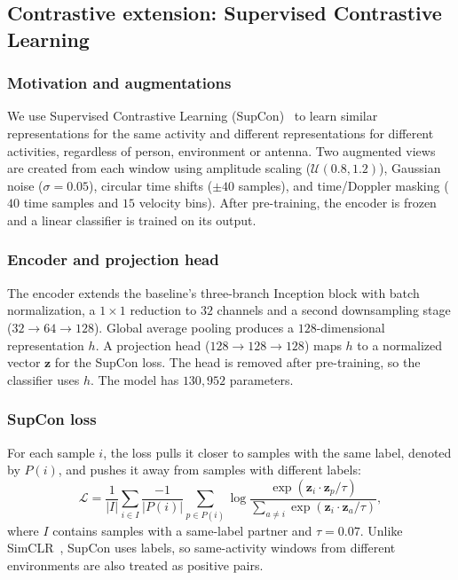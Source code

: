 \subsection{Contrastive extension: Supervised Contrastive Learning}
\label{sec:contrastive}

\subsubsection{Motivation and augmentations}
We use Supervised Contrastive Learning (SupCon)~\cite{supcon} to learn similar
representations for the same activity and different representations for
different activities, regardless of person, environment or antenna. Two
augmented views are created from each window using amplitude scaling
($\mathcal{U}(0.8,1.2)$), Gaussian noise ($\sigma=0.05$), circular time shifts
($\pm40$ samples), and time/Doppler masking ($40$ time samples and $15$
velocity bins). After pre-training, the encoder is frozen and a linear
classifier is trained on its output.

\subsubsection{Encoder and projection head}
The encoder extends the baseline's three-branch Inception block with batch
normalization, a $1\times1$ reduction to $32$ channels and a second
downsampling stage ($32\!\rightarrow\!64\!\rightarrow\!128$). Global average
pooling produces a $128$-dimensional representation $h$. A projection head
($128\!\rightarrow\!128\!\rightarrow\!128$) maps $h$ to a normalized vector
$\bm{z}$ for the SupCon loss. The head is removed after pre-training, so the
classifier uses $h$. The model has $130{,}952$ parameters.

\subsubsection{SupCon loss}
For each sample $i$, the loss pulls it closer to samples with the same label,
denoted by $P(i)$, and pushes it away from samples with different labels:
\begin{equation}
\label{eq:supcon}
\mathcal{L}=\frac{1}{|I|}\sum_{i\in I}\frac{-1}{|P(i)|}\sum_{p\in P(i)}
\log\frac{\exp(\bm{z}_i\!\cdot\!\bm{z}_p/\tau)}
{\sum_{a\neq i}\exp(\bm{z}_i\!\cdot\!\bm{z}_a/\tau)},
\end{equation}
where $I$ contains samples with a same-label partner and $\tau=0.07$. Unlike
SimCLR~\cite{simclr}, SupCon uses labels, so same-activity windows from
different environments are also treated as positive pairs.

